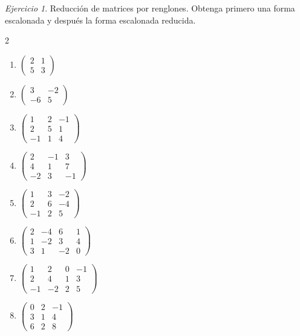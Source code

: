 \documentclass[12pt]{article}
\theoremstyle{remark}
\newtheorem{Ejer}[definicion]{Ejercicio}
\begin{document}
\begin{Ejer} Reducción de matrices por renglones. Obtenga primero una forma escalonada y después la forma escalonada reducida.

\begin{multicols}{2}
\begin{enumerate}[resume]
\item $\begin{pmatrix}2&1\\5&3\end{pmatrix}$
\item $\begin{pmatrix}3&-2\\-6&5\end{pmatrix}$
\item $\begin{pmatrix}1&2&-1\\2&5&1\\-1&1&4\end{pmatrix}$
\item $\begin{pmatrix}2&-1&3\\4&1&7\\-2&3&-1\end{pmatrix}$
\item $\begin{pmatrix}1&3&-2\\2&6&-4\\-1&2&5\end{pmatrix}$
\item $\begin{pmatrix}2&-4&6&1\\1&-2&3&4\\3&1&-2&0\end{pmatrix}$
\item $\begin{pmatrix}1&2&0&-1\\2&4&1&3\\-1&-2&2&5\end{pmatrix}$
\item $\begin{pmatrix}0&2&-1\\3&1&4\\6&2&8\end{pmatrix}$
\end{enumerate}
\end{multicols}
\end{Ejer}
\end{document}

